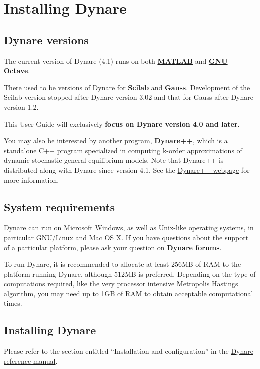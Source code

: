 \chapter{Installing Dynare} \label{ch:inst}

\section{Dynare versions}

The current version of Dynare (4.1) runs on both \href{http://www.mathworks.com/products/matlab/}{\textbf{MATLAB}} and \href{http://www.octave.org}{\textbf{GNU Octave}}.

There used to be versions of Dynare for \textbf{Scilab} and \textbf{Gauss}. Development of the Scilab version stopped after Dynare version 3.02 and that for Gauss after Dynare version 1.2.

This User Guide will exclusively \textbf{focus on Dynare version 4.0 and later}.

You may also be interested by another program, \textbf{Dynare++}, which is a standalone C++ program specialized in computing k-order approximations of dynamic stochastic general equilibrium models. Note that Dynare++ is distributed along with Dynare since version 4.1. See the \href{http://www.dynare.org/documentation-and-support/dynarepp}{Dynare++ webpage} for more information. 

\section{System requirements}
Dynare can run on Microsoft Windows, as well as Unix-like operating systems, in particular GNU/Linux and Mac OS X. If you have questions about the support of a particular platform, please ask your question on \href{http://www.dynare.org/phpBB3}{\textbf{Dynare forums}}.

To run Dynare, it is recommended to allocate at least 256MB of RAM to the platform running Dynare, although 512MB is preferred. Depending on the type of computations required, like the very processor intensive Metropolis Hastings algorithm, you may need up to 1GB of RAM to obtain acceptable computational times.

\section{Installing Dynare}

Please refer to the section entitled ``Installation and configuration'' in the \href{http://www.dynare.org/documentation-and-support/manual}{Dynare reference manual}.

